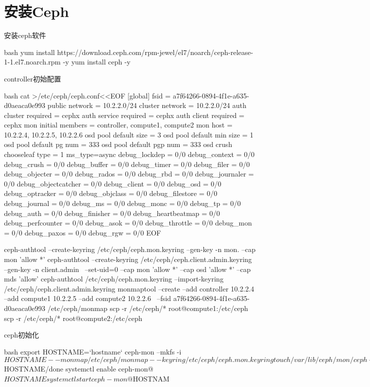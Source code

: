 \section{安装Ceph}
\label{section:ceph_configuration}
\begin{outline}[enumerate]

\1 安装ceph软件
\begin{code-in-enumerate}{bash}
yum install https://download.ceph.com/rpm-jewel/el7/noarch/ceph-release-1-1.el7.noarch.rpm -y
yum install ceph -y
\end{code-in-enumerate}

\1 controller初始配置
\begin{code-in-enumerate}{bash}
cat >/etc/ceph/ceph.conf<<EOF
[global]
fsid = a7f64266-0894-4f1e-a635-d0aeaca0e993
public network = 10.2.2.0/24
cluster network = 10.2.2.0/24
auth cluster required = cephx
auth service required = cephx
auth client required = cephx
mon initial members = controller, compute1, compute2
mon host = 10.2.2.4, 10.2.2.5, 10.2.2.6
osd pool default size = 3
osd pool default min size = 1
osd pool default pg num = 333
osd pool default pgp num = 333
osd crush chooseleaf type = 1
ms_type=async
debug_lockdep = 0/0
debug_context = 0/0
debug_crush = 0/0
debug_buffer = 0/0
debug_timer = 0/0
debug_filer = 0/0
debug_objecter = 0/0
debug_rados = 0/0
debug_rbd = 0/0
debug_journaler = 0/0
debug_objectcatcher = 0/0
debug_client = 0/0
debug_osd = 0/0
debug_optracker = 0/0
debug_objclass = 0/0
debug_filestore = 0/0
debug_journal = 0/0
debug_ms = 0/0
debug_monc = 0/0
debug_tp = 0/0
debug_auth = 0/0
debug_finisher = 0/0
debug_heartbeatmap = 0/0
debug_perfcounter = 0/0
debug_asok = 0/0
debug_throttle = 0/0
debug_mon = 0/0
debug_paxos = 0/0
debug_rgw = 0/0
EOF

ceph-authtool --create-keyring /etc/ceph/ceph.mon.keyring --gen-key -n mon. --cap mon 'allow *'
ceph-authtool --create-keyring /etc/ceph/ceph.client.admin.keyring --gen-key -n client.admin \
    --set-uid=0 --cap mon 'allow *' --cap osd 'allow *' --cap mds 'allow'
ceph-authtool /etc/ceph/ceph.mon.keyring --import-keyring /etc/ceph/ceph.client.admin.keyring
monmaptool --create --add controller 10.2.2.4 --add compute1 10.2.2.5 --add compute2 10.2.2.6 \
    --fsid a7f64266-0894-4f1e-a635-d0aeaca0e993 /etc/ceph/monmap
scp -r /etc/ceph/* root@compute1:/etc/ceph
scp -r /etc/ceph/* root@compute2:/etc/ceph
\end{code-in-enumerate}

\1 ceph初始化
\begin{code-in-enumerate}{bash}
export HOSTNAME=`hostname`
ceph-mon --mkfs -i $HOSTNAME --monmap /etc/ceph/monmap --keyring /etc/ceph/ceph.mon.keyring
touch /var/lib/ceph/mon/ceph-$HOSTNAME/done
systemctl enable ceph-mon@$HOSTNAME
systemctl start ceph-mon@$HOSTNAM


\end{code-in-enumerate}
\end{outline}
